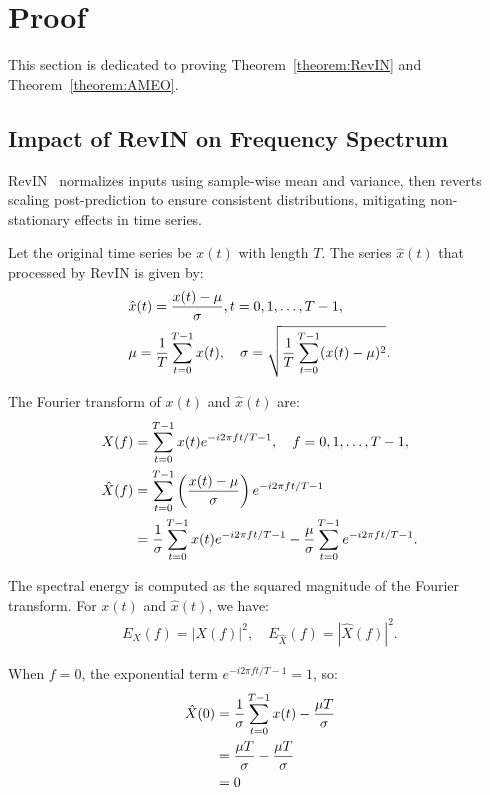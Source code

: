\appendix
\section{Proof}
\label{app:Proof}
This section is dedicated to proving Theorem~\ref{theorem:RevIN} and Theorem~\ref{theorem:AMEO}.

\subsection{Impact of RevIN on Frequency Spectrum}
\label{app:RevIN}

RevIN~\citep{Kim_revin,liu2022non} normalizes inputs using sample-wise mean and variance, then reverts scaling post-prediction to ensure consistent distributions, mitigating non-stationary effects in time series. 

Let the original time series be $ x(t) $ with length $ T $. The series $\hat{x}(t)$ that processed by RevIN is given by:
\vspace{-0.2cm}
\begin{align}
&\hat{x}(t) = \frac{x(t) - \mu}{\sigma},t = 0, 1, \dots, T-1,\notag\\
&\mu = \frac{1}{T} \sum_{t=0}^{T-1} x(t), \quad \sigma = \sqrt{\frac{1}{T} \sum_{t=0}^{T-1} (x(t) - \mu)^2}.
\end{align}
\vspace{-0.2cm}

The Fourier transform of $x(t)$ and $\hat{x}(t)$ are:
\vspace{-0.2cm}
\begin{align}
X(f) &= \sum_{t=0}^{T-1} x(t) e^{-i 2 \pi f t / {T-1}}, \quad f = 0, 1, \dots, T-1,\notag\\
\hat{X}(f)&=\sum_{t=0}^{T-1} \left(\frac{x(t) - \mu}{\sigma}\right) e^{-i 2 \pi f t / {T-1}} \notag\\
&=\frac{1}{\sigma} \sum_{t=0}^{T-1} x(t) e^{-i 2 \pi f t / {T-1}} - \frac{\mu}{\sigma} \sum_{t=0}^{T-1} e^{-i 2 \pi f t / {T-1}}.
\end{align}
\vspace{-0.2cm}

The spectral energy is computed as the squared magnitude of the Fourier transform. For $ x(t) $ and $ \hat{x}(t) $, we have: 
\begin{align}
E_X(f) = |X(f)|^2, \quad E_{\hat{X}}(f) = |\hat{X}(f)|^2.
\end{align}

When $ f = 0 $, the exponential term $ e^{-i 2 \pi f t / {T-1}} = 1 $, so: 
\begin{align}
\hat{X}(0)&=\frac{1}{\sigma} \sum_{t=0}^{T-1} x(t)-\frac{\mu T}{\sigma}\notag\\
&=\frac{\mu T}{\sigma}-\frac{\mu T}{\sigma}\notag\\
&=0
\end{align}


